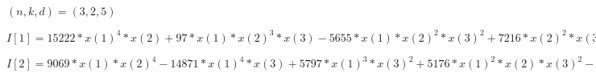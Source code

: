 \begin{example}[Example 5]
$(n,k,d) = (3,2,5)$

$I[1]=15222*x(1)^4*x(2)+97*x(1)*x(2)^3*x(3)-5655*x(1)*x(2)^2*x(3)^2+7216*x(2)^2*x(3)^3+14851*x(1)^3*x(2)+5305*x(2)^3*x(3)+13634*x(2)^2*x(3)^2-14410*x(1)*x(3)^3+2870*x(1)^3+14621*x(1)^2*x(3)-13160*x(2)^2*x(3)+4780*x(1)^2-15656*x(1)*x(3)+5990$

$I[2]=9069*x(1)*x(2)^4-14871*x(1)^4*x(3)+5797*x(1)^3*x(3)^2+5176*x(1)^2*x(2)*x(3)^2-12149*x(1)*x(2)*x(3)^3+5288*x(2)^2*x(3)^3-3161*x(1)*x(3)^4-9025*x(1)^3*x(2)+11698*x(1)^2*x(3)^2-6343*x(1)*x(2)*x(3)^2-15349*x(2)^2*x(3)^2-3744*x(1)^2*x(2)+8838*x(2)^3-10819*x(1)*x(2)-9615*x(1)-7373*x(2)$
\end{example}
